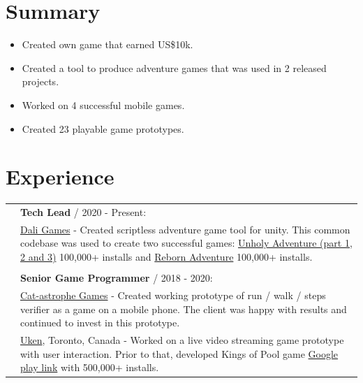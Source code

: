 \documentclass[12pt,a4paper]{article}
\begin{document}
\begin{multicols}{2}

\section*{Summary}

\begin{itemize}
	\item Created own game that earned US\$10k. 
	\item Created a tool to produce adventure games that was used in 2 released projects.
	\item Worked on 4 successful mobile games.
	\item Created 23 playable game prototypes.
\end{itemize}

\section*{Experience }

	\begin{tabular}{ >{\RaggedLeft}p{0cm}   p{9cm}  } 
 
		&  \textbf{Tech Lead} / 2020 - Present: \\
		&  \hspace{5mm}  {\href{https://dali.games/}{Dali Games}} - Created scriptless adventure game tool for unity. This common codebase was used to create two successful games: {\href{https://play.google.com/store/apps/details?id=games.dali.adventure.neighborhood.unholy}{Unholy Adventure (part 1, 2 and 3)}} 100,000+ installs and {\href{https://play.google.com/store/apps/details?id=games.dali.adventure.reborn}{Reborn Adventure}} 100,000+ installs.   \\

		& \\

		 & \textbf{Senior Game Programmer} / 2018 - 2020:  \\
		& \hspace{5mm} {\href{https://cat-astrophe-games.com/}{Cat-astrophe Games}} - Created working prototype of run / walk / steps verifier as a game on a mobile phone. The client was happy with results and continued to invest in this prototype.  \\

		& \hspace{5mm} {\href{https://www.uken.com/}{Uken}}, Toronto, Canada  - Worked on a live video streaming game prototype with user interaction. Prior to that, developed Kings of Pool game {\href{https://play.google.com/store/apps/details?id=com.uken.pool}{Google play link}} with  500,000+ installs.  \\


\end{tabular}
\end{multicols}
\end{document}
